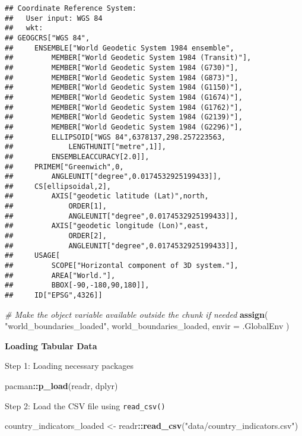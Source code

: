 \documentclass[
]{article}
\newenvironment{Shaded}{\begin{snugshade}}{\end{snugshade}}
\newcommand{\AttributeTok}[1]{\textcolor[rgb]{0.13,0.29,0.53}{#1}}
\newcommand{\CommentTok}[1]{\textcolor[rgb]{0.56,0.35,0.01}{\textit{#1}}}
\newcommand{\FunctionTok}[1]{\textcolor[rgb]{0.13,0.29,0.53}{\textbf{#1}}}
\newcommand{\NormalTok}[1]{#1}
\newcommand{\OtherTok}[1]{\textcolor[rgb]{0.56,0.35,0.01}{#1}}
\newcommand{\SpecialCharTok}[1]{\textcolor[rgb]{0.81,0.36,0.00}{\textbf{#1}}}
\newcommand{\StringTok}[1]{\textcolor[rgb]{0.31,0.60,0.02}{#1}}
\begin{document}
\begin{verbatim}
## Coordinate Reference System:
##   User input: WGS 84 
##   wkt:
## GEOGCRS["WGS 84",
##     ENSEMBLE["World Geodetic System 1984 ensemble",
##         MEMBER["World Geodetic System 1984 (Transit)"],
##         MEMBER["World Geodetic System 1984 (G730)"],
##         MEMBER["World Geodetic System 1984 (G873)"],
##         MEMBER["World Geodetic System 1984 (G1150)"],
##         MEMBER["World Geodetic System 1984 (G1674)"],
##         MEMBER["World Geodetic System 1984 (G1762)"],
##         MEMBER["World Geodetic System 1984 (G2139)"],
##         MEMBER["World Geodetic System 1984 (G2296)"],
##         ELLIPSOID["WGS 84",6378137,298.257223563,
##             LENGTHUNIT["metre",1]],
##         ENSEMBLEACCURACY[2.0]],
##     PRIMEM["Greenwich",0,
##         ANGLEUNIT["degree",0.0174532925199433]],
##     CS[ellipsoidal,2],
##         AXIS["geodetic latitude (Lat)",north,
##             ORDER[1],
##             ANGLEUNIT["degree",0.0174532925199433]],
##         AXIS["geodetic longitude (Lon)",east,
##             ORDER[2],
##             ANGLEUNIT["degree",0.0174532925199433]],
##     USAGE[
##         SCOPE["Horizontal component of 3D system."],
##         AREA["World."],
##         BBOX[-90,-180,90,180]],
##     ID["EPSG",4326]]
\end{verbatim}

\begin{Shaded}
\begin{Highlighting}[]
\CommentTok{\# Make the object variable available outside the chunk if needed}
\FunctionTok{assign}\NormalTok{(}
  \StringTok{"world\_boundaries\_loaded"}\NormalTok{,}
\NormalTok{  world\_boundaries\_loaded,}
  \AttributeTok{envir =}\NormalTok{ .GlobalEnv}
\NormalTok{)}
\end{Highlighting}
\end{Shaded}

\textbf{Loading Tabular Data}

Step 1: Loading necessary packages

\begin{Shaded}
\begin{Highlighting}[]
\NormalTok{pacman}\SpecialCharTok{::}\FunctionTok{p\_load}\NormalTok{(readr, dplyr)}
\end{Highlighting}
\end{Shaded}

Step 2: Load the CSV file using \texttt{read\_csv()}

\begin{Shaded}
\begin{Highlighting}[]
\NormalTok{country\_indicators\_loaded }\OtherTok{\textless{}{-}}\NormalTok{ readr}\SpecialCharTok{::}\FunctionTok{read\_csv}\NormalTok{(}\StringTok{"data/country\_indicators.csv"}\NormalTok{)}
\end{Highlighting}
\end{Shaded}
\end{document}
